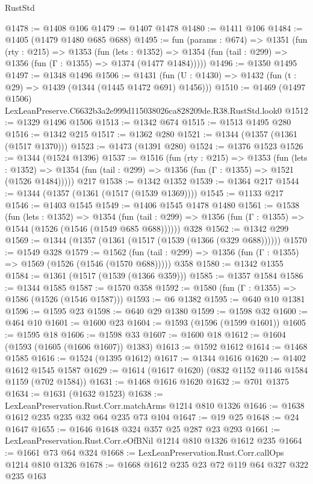 \begin{lexlean}{RustStd}
\begin{coremodule}
@1478 := @1408 @106
@1479 := @1407 @1478
@1480 := @1411 @106
@1484 := @1405 (@1479 @1480 @685 @688)
@1495 := fun (params : @674) =>
  @1351
    (fun (rty : @215) =>
    @1353
      (fun (lets : @1352) =>
      @1354 (fun (tail : @299) => @1356 (fun (Γ : @1355) => @1374 (@1477 @1484)))))
@1496 := @1350 @1495
@1497 := @1348 @1496
@1506 := @1431 (fun (U : @1430) => @1432 (fun (t : @29) => @1439 (@1344 (@1445 @1472 @691) @1456)))
@1510 := @1469 (@1497 @1506) LexLeanPreserve.C6632b3a2e999d115038026ca828209de.R38.RustStd.look0
@1512 := @1329 @1496 @1506
@1513 := @1342 @674
@1515 := @1513 @1495 @280
@1516 := @1342 @215
@1517 := @1362 @280
@1521 := @1344 (@1357 (@1361 (@1517 @1370)))
@1523 := @1473 (@1391 @280)
@1524 := @1376 @1523
@1526 := @1344 (@1524 @1396)
@1537 := @1516
    (fun (rty : @215) =>
    @1353
      (fun (lets : @1352) =>
      @1354 (fun (tail : @299) => @1356 (fun (Γ : @1355) => @1521 (@1526 @1484)))))
    @217
@1538 := @1342 @1352
@1539 := @1364 @217
@1544 := @1344 (@1357 (@1361 (@1517 (@1539 @1369))))
@1545 := @1133 @217
@1546 := @1403 @1545
@1549 := @1406 @1545 @1478 @1480
@1561 := @1538
    (fun (lets : @1352) =>
    @1354 (fun (tail : @299) => @1356 (fun (Γ : @1355) => @1544 (@1526 (@1546 (@1549 @685 @688))))))
    @328
@1562 := @1342 @299
@1569 := @1344 (@1357 (@1361 (@1517 (@1539 (@1366 (@329 @688))))))
@1570 := @1549 @328
@1579 := @1562
    (fun (tail : @299) => @1356 (fun (Γ : @1355) => @1569 (@1526 (@1546 (@1570 @688)))))
    @358
@1580 := @1342 @1355
@1584 := @1361 (@1517 (@1539 (@1366 @359)))
@1585 := @1357 @1584
@1586 := @1344 @1585
@1587 := @1570 @358
@1592 := @1580 (fun (Γ : @1355) => @1586 (@1526 (@1546 @1587)))
@1593 := @6 @1382
@1595 := @640 @10 @1381
@1596 := @1595 @23
@1598 := @640 @29 @1380
@1599 := @1598 @32
@1600 := @464 @10
@1601 := @1600 @23
@1604 := @1593 (@1596 (@1599 @1601))
@1605 := @1595 @18
@1606 := @1598 @33
@1607 := @1600 @18
@1612 := @1604 (@1593 (@1605 (@1606 @1607)) @1383)
@1613 := @1592 @1612
@1614 := @1468 @1585
@1616 := @1524 (@1395 @1612)
@1617 := @1344 @1616
@1620 := @1402 @1612 @1545 @1587
@1629 := @1614 (@1617 @1620) (@832 @1152 @1146 @1584 @1159 (@702 @1584))
@1631 := @1468 @1616 @1620
@1632 := @701 @1375
@1634 := @1631 (@1632 @1523)
@1638 := LexLeanPreservation.Rust.Corr.matchArms @1214 @810 @1326
@1646 := @1638 @1612 @235 @235 @32 @64 @235 @73 @104
@1647 := @19 @25
@1648 := @24 @1647
@1655 := @1646 @1648 @324 @357 @25 @287 @23 @293
@1661 := LexLeanPreservation.Rust.Corr.eOfBNil @1214 @810 @1326 @1612 @235
@1664 := @1661 @73 @64 @324
@1668 := LexLeanPreservation.Rust.Corr.callOps @1214 @810 @1326
@1678 := @1668 @1612 @235 @23 @72 @119 @64 @327 @322 @235 @163

\end{coremodule}
\end{lexlean}
